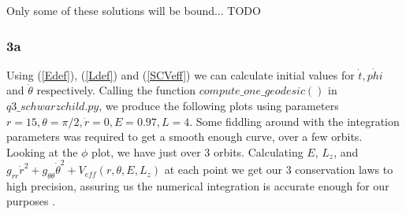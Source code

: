 \documentclass[10pt,a4paper]{report}
\begin{document}
Only some of these solutions will be bound... TODO

\subsubsection*{3a}

Using (\ref{Edef}), (\ref{Ldef}) and (\ref{SCVeff}) we can calculate initial values for $\dot{t}, \dot{phi}$ and $\dot{\theta}$ respectively. Calling the function $compute\_one\_geodesic()$ in $q3\_schwarzchild.py$, we produce the following plots using parameters $r=15, \theta=\pi/2, \dot{r}=0, E=0.97, L=4$. Some fiddling around with the integration parameters was required to get a smooth enough curve, over a few orbits. Looking at the $\phi$ plot, we have just over 3 orbits. Calculating $E$, $L_z$, and $g_{rr}\dot{r}^2+g_{\theta\theta}\dot{\theta}^2 + V_{eff}(r, \theta, E, L_z)$ at each point we get our 3 conservation laws to high precision, assuring us the numerical integration is accurate enough for our purposes .
\end{document}

